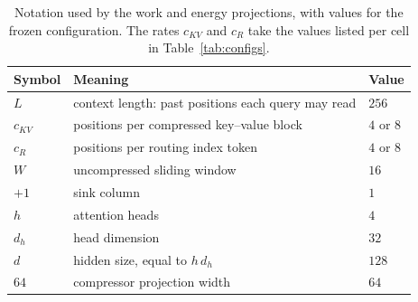 \begin{table}[t]
\centering
\small
\caption{Notation used by the work and energy projections, with values for
the frozen configuration. The rates $c_{KV}$ and $c_R$ take the values listed
per cell in Table~\ref{tab:configs}.}
\label{tab:notation}
\begin{tabular}{lll}
\toprule
Symbol & Meaning & Value \\
\midrule
$L$ & context length: past positions each query may read & $256$ \\
$c_{KV}$ & positions per compressed key--value block & $4$ or $8$ \\
$c_R$ & positions per routing index token & $4$ or $8$ \\
$W$ & uncompressed sliding window & $16$ \\
$+1$ & sink column & $1$ \\
$h$ & attention heads & $4$ \\
$d_h$ & head dimension & $32$ \\
$d$ & hidden size, equal to $h\,d_h$ & $128$ \\
$64$ & compressor projection width & $64$ \\
\bottomrule
\end{tabular}
\end{table}

